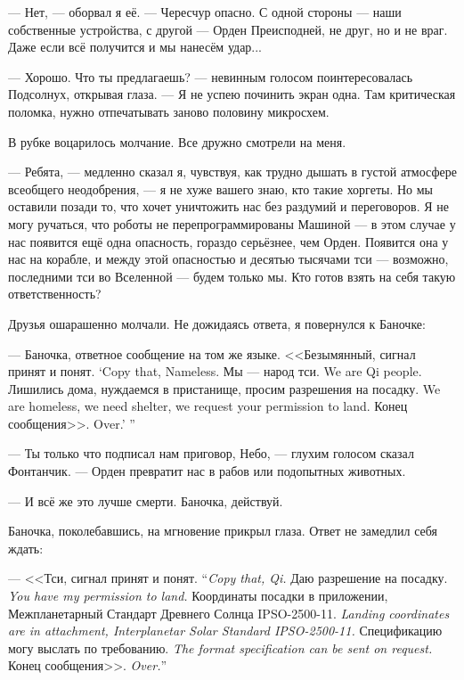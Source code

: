 --- Нет, --- оборвал я её.
--- Чересчур опасно.
С одной стороны --- наши собственные устройства, с другой --- Орден Преисподней, не друг, но и не враг.
Даже если всё получится и мы нанесём удар...

--- Хорошо.
Что ты предлагаешь? --- невинным голосом поинтересовалась Подсолнух, открывая глаза.
--- Я не успею починить экран одна.
Там критическая поломка, нужно отпечатывать заново половину микросхем.

В рубке воцарилось молчание.
Все дружно смотрели на меня.

--- Ребята, --- медленно сказал я, чувствуя, как трудно дышать в густой атмосфере всеобщего неодобрения, --- я не хуже вашего знаю, кто такие хоргеты.
Но мы оставили позади то, что хочет уничтожить нас без раздумий и переговоров.
Я не могу ручаться, что роботы не перепрограммированы Машиной --- в этом случае у нас появится ещё одна опасность, гораздо серьёзнее, чем Орден.
Появится она у нас на корабле, и между этой опасностью и десятью тысячами тси --- возможно, последними тси во Вселенной --- будем только мы.
Кто готов взять на себя такую ответственность?

Друзья ошарашенно молчали. Не дожидаясь ответа, я повернулся к Баночке:

--- Баночка, ответное сообщение на том же языке.
{<<Безымянный, сигнал принят и понят.}
{`Copy that, Nameless.}
{Мы --- народ тси.}
{We are Qi people.}
{Лишились дома, нуждаемся в пристанище, просим разрешения на посадку.}
{We are homeless, we need shelter, we request your permission to land.}
{Конец сообщения>>.}
{Over.' ''}

--- Ты только что подписал нам приговор, Небо, --- глухим голосом сказал Фонтанчик.
--- Орден превратит нас в рабов или подопытных животных.

--- И всё же это лучше смерти.
Баночка, действуй.

Баночка, поколебавшись, на мгновение прикрыл глаза.
Ответ не замедлил себя ждать:

{--- <<Тси, сигнал принят и понят.}
{``\textit{Copy that, Qi.}}
{Даю разрешение на посадку.}
{\textit{You have my permission to land.}}
{Координаты посадки в приложении, Межпланетарный Стандарт Древнего Солнца IPSO-2500-11.}
{\textit{Landing coordinates are in attachment, Interplanetar Solar Standard IPSO-2500-11.}}
{Спецификацию могу выслать по требованию.}
{\textit{The format specification can be sent on request.}}
{Конец сообщения>>.}
{\textit{Over.}''}

